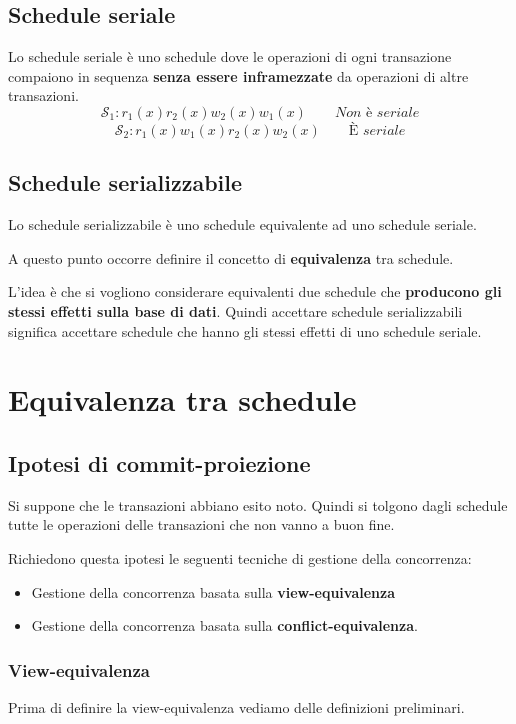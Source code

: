 \documentclass[oneside,a4paper,11pt]{book}
\theoremstyle{italicstyle}
\theoremstyle{normStyle}
\begin{document}
\subsection{Schedule seriale}
Lo schedule seriale è uno schedule dove le operazioni di ogni transazione compaiono 
in sequenza \textbf{senza essere inframezzate} da operazioni di altre transazioni.
\[
  \mathcal{S}_1:r_1(x)r_2(x)w_2(x)w_1(x)\qquad \textit{Non è seriale}
\]
\[
  \mathcal{S}_2:r_1(x)w_1(x)r_2(x)w_2(x)\qquad \textit{È seriale}
\]
\subsection{Schedule serializzabile}
Lo schedule serializzabile è uno schedule equivalente ad uno schedule seriale.

A questo punto occorre definire il concetto di \textbf{equivalenza} tra schedule.
\begin{tcolorbox}[title = {Equivalenza}]
L'idea è che si vogliono considerare equivalenti due schedule che \textbf{producono gli stessi 
effetti sulla base di dati}. Quindi accettare schedule serializzabili significa 
accettare schedule che hanno gli stessi effetti di uno schedule seriale.
\end{tcolorbox}
\section{Equivalenza tra schedule}
\subsection{Ipotesi di commit-proiezione}
Si suppone che le transazioni abbiano esito noto. Quindi si tolgono dagli schedule 
tutte le operazioni delle transazioni che non vanno a buon fine.

Richiedono questa ipotesi le seguenti tecniche di gestione della concorrenza:
\begin{itemize}
  \item Gestione della concorrenza basata sulla \textbf{view-equivalenza}
  \item Gestione della concorrenza basata sulla \textbf{conflict-equivalenza}.
\end{itemize}
\subsubsection{View-equivalenza}
Prima di definire la view-equivalenza vediamo delle definizioni preliminari.
\end{document}
